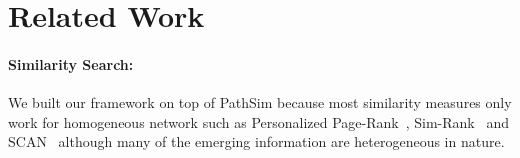 \section{Related Work}
\label{sec:rel-work}

\paragraph{Similarity Search:} We built our framework on top of PathSim because
most similarity measures only work for homogeneous network such
as Personalized Page-Rank~\cite{jeh2003scaling}, Sim-Rank~\cite{jeh2002simrank}
and SCAN~\cite{xu2007scan} although many of the emerging information are
heterogeneous in nature.
